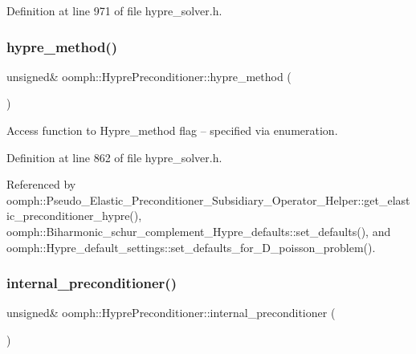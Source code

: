 Definition at line 971 of file hypre\+\_\+solver.\+h.

\mbox{\label{classoomph_1_1HyprePreconditioner_a62f977047d4b26a11da2bb7c98beeaca}} 
\subsubsection{\texorpdfstring{hypre\+\_\+method()}{hypre\_method()}}
{\footnotesize\ttfamily unsigned\& oomph\+::\+Hypre\+Preconditioner\+::hypre\+\_\+method (\begin{DoxyParamCaption}{ }\end{DoxyParamCaption})\hspace{0.3cm}{\ttfamily [inline]}}



Access function to Hypre\+\_\+method flag -- specified via enumeration. 



Definition at line 862 of file hypre\+\_\+solver.\+h.



Referenced by oomph\+::\+Pseudo\+\_\+\+Elastic\+\_\+\+Preconditioner\+\_\+\+Subsidiary\+\_\+\+Operator\+\_\+\+Helper\+::get\+\_\+elastic\+\_\+preconditioner\+\_\+hypre(), oomph\+::\+Biharmonic\+\_\+schur\+\_\+complement\+\_\+\+Hypre\+\_\+defaults\+::set\+\_\+defaults(), and oomph\+::\+Hypre\+\_\+default\+\_\+settings\+::set\+\_\+defaults\+\_\+for\+\_\+D\+\_\+poisson\+\_\+problem().

\mbox{\label{classoomph_1_1HyprePreconditioner_aa7396f1be54c31883c25e5d89f0af681}} 
\subsubsection{\texorpdfstring{internal\+\_\+preconditioner()}{internal\_preconditioner()}}
{\footnotesize\ttfamily unsigned\& oomph\+::\+Hypre\+Preconditioner\+::internal\+\_\+preconditioner (\begin{DoxyParamCaption}{ }\end{DoxyParamCaption})\hspace{0.3cm}{\ttfamily [inline]}}



